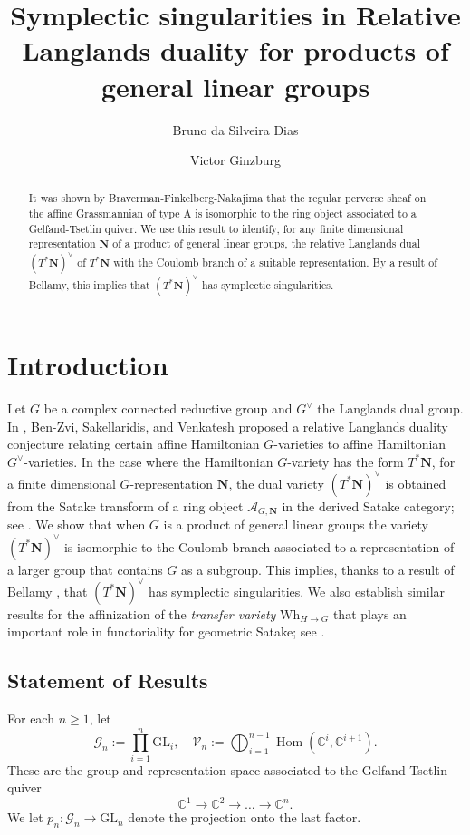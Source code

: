 \documentclass[11pt]{amsart}
\title{Symplectic singularities in Relative Langlands duality for products of general linear groups}
\date{}
\author{Bruno da Silveira Dias}
\author{Victor Ginzburg}
\theoremstyle{definition}
\theoremstyle{plain}
\theoremstyle{remark}
\newcommand{\GL}{\mathrm{GL}}
\newcommand{\numberset}{\mathbb}
\newcommand{\C}{\numberset{C}}
\newcommand{\Wh}{\mathrm{Wh}}
\DeclareMathOperator{\Hom}{Hom}
\begin{document}
	
    \begin{abstract}
        It was shown by Braverman-Finkelberg-Nakajima that the regular perverse sheaf on the affine Grassmannian of type A is isomorphic to the ring object associated to a Gelfand-Tsetlin quiver. We use this result to identify, for any finite dimensional representation $\mathbf{N}$ of a product of general linear groups, the relative Langlands dual $(T^*\mathbf{N})^\vee$ of $T^*\mathbf{N}$ with the Coulomb branch of a suitable representation. By a result of Bellamy, this implies that $(T^*\mathbf{N})^\vee$ has symplectic singularities.
    \end{abstract}
    \maketitle
    
    \section{Introduction}

    Let $G$ be a complex connected reductive group and $G^\vee$ the Langlands dual group. In \cite{benzvi2024relativelanglandsduality}, Ben-Zvi, Sakellaridis, and Venkatesh proposed a relative Langlands duality conjecture relating certain affine Hamiltonian $G$-varieties to affine Hamiltonian $G^\vee$-varieties. In the case where the Hamiltonian $G$-variety has the form $T^*\mathbf{N}$, for a finite dimensional $G$-representation $\mathbf{N}$, the dual variety $(T^*\mathbf{N})^\vee$ is obtained from the Satake transform of a ring object $\mathcal{A}_{G,\mathbf{N}}$ in the derived Satake category; see \cite{BFN-Ring}. We show that when $G$ is a product of general linear groups the variety $(T^*\mathbf{N})^\vee$ is isomorphic to the Coulomb branch associated to a representation of a larger group that contains $G$ as a subgroup. This implies, thanks to a result of Bellamy \cite{Bellamy2023}, that $(T^*\mathbf{N})^\vee$ has symplectic singularities. We also establish similar results for the affinization of the \emph{transfer variety} $\Wh_{H \to G}$ that plays an important role in functoriality for geometric Satake; see \cite[Section 2]{ginzburg2025pointwisepurityderivedsatake}.


    \subsection{Statement of Results}
    For each $n \geq 1$, let
    \[
        \mathcal{G}_n := \prod_{i=1}^n \GL_i,\quad  \mathcal{V}_n := \bigoplus_{i=1}^{n-1} \Hom(\C^i,\C^{i+1}).
    \]
    These are the group and representation space associated to the Gelfand-Tsetlin quiver
    \[
        \C^1 \to \C^2 \to \dots \to \C^n.
    \]
    We let $p_n\colon \mathcal{G}_n \to \GL_n$ denote the projection onto the last factor.
\end{document}
